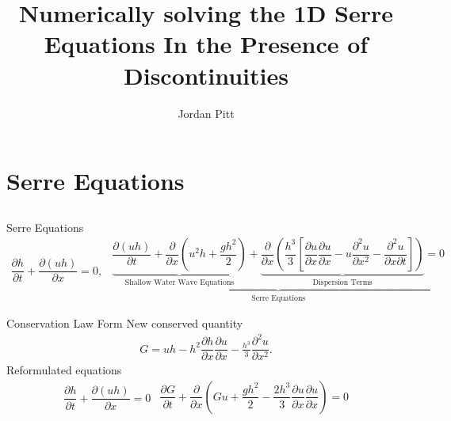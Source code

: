 \documentclass[pdf]{beamer}
\title{Numerically solving the 1D Serre Equations In the Presence of Discontinuities}
\author{Jordan Pitt}
\begin{document}
\begin{frame}
\titlepage
\end{frame}
\section{Serre Equations}
\subsection{}

\begin{frame}{Serre Equations}
\begin{subequations}\label{eq:Serre_conservative_form}
\begin{gather}
\dfrac{\partial h}{\partial t} + \dfrac{\partial (uh)}{\partial x} = 0,
\label{eq:Serre_continuity}
\end{gather}
\begin{gather}
\underbrace{\underbrace{\dfrac{\partial (uh)}{\partial t} + \dfrac{\partial}{\partial x} \left ( u^2h + \dfrac{gh^2}{2}\right )}_{\text{Shallow Water Wave Equations}} + \underbrace{\dfrac{\partial}{\partial x} \left (  \dfrac{h^3}{3} \left [ \dfrac{\partial u }{\partial x} \dfrac{\partial u}{\partial x} -u \dfrac{\partial^2 u}{\partial x^2}  - \dfrac{\partial^2 u}{\partial x \partial t}\right ] \right )}_{\text{Dispersion Terms}} = 0}_{\text{Serre Equations}}
\label{eq:Serre_momentum}
\end{gather}
\end{subequations}
\end{frame}

\begin{frame}{Conservation Law Form}
New conserved quantity
\begin{gather}\label{eq:Gdefinition}
G = uh - h^2 \dfrac{\partial h}{\partial x} \dfrac{\partial u}{\partial x} - \frac{h^3}{3} \dfrac{\partial^2 u}{\partial x^2}.
\end{gather}
Reformulated equations
\begin{subequations}
\begin{gather}
\dfrac{\partial h}{\partial t} + \dfrac{\partial (uh)}{\partial x} = 0
\label{eq:Serrecon_continuity}
\end{gather}
\begin{gather}
\dfrac{\partial G}{\partial t} + \dfrac{\partial}{\partial x}\left(Gu + \dfrac{gh^2}{2} - \dfrac{2h^3}{3}\dfrac{\partial u}{\partial x}\dfrac{\partial u}{\partial x}\right) = 0
\label{eq:Serrecon_momentum}
\end{gather}
\label{eq:Serrecon}
\end{subequations}
\end{frame}
\end{document}
